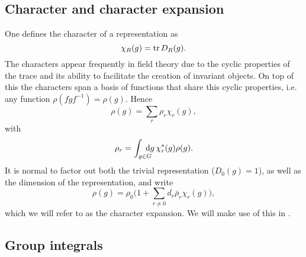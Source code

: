 \subsection{Character and character expansion}

One defines the character of a representation as
%
\begin{equation}
  \chi_R(g) = \operatorname{tr} D_R(g).
\end{equation}
%
The characters appear frequently in field theory due to the cyclic properties of
the trace and its ability to facilitate the creation of invariant objects. On
top of this the characters span a basis of functions that share this cyclic
properties, i.e. any function $\rho(f g f^{-1}) = \rho(g)$. Hence
%
\begin{equation}
  \rho(g) = \sum_r \rho_r \chi_r(g),
\end{equation}
%
with
\begin{equation}
  \rho_r = \int_{\mathrlap{g \in G}\hskip1.5ex} \mathrm{d}g \, \chi_r^*(g) \rho(g).
\end{equation}
%
It is normal to factor out both the trivial representation ($D_0(g) = 1$), as
well as the dimension of the representation, and write
%
\begin{equation}
  \rho(g) = \rho_0 \Big(1 + \sum_{r \neq 0} d_r \bar{\rho}_r \chi_r(g)\Big),
\end{equation}
%
which we will refer to as the character expansion. We will make use of this in
.

\subsection{Group integrals}

